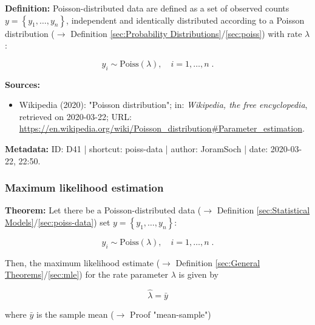 \documentclass[a4paper,12pt,twoside]{book}
\begin{document}
\textbf{Definition:} Poisson-distributed data are defined as a set of observed counts $y = \left\lbrace y_1, \ldots, y_n \right\rbrace$, independent and identically distributed according to a Poisson distribution ($\rightarrow$ Definition \ref{sec:Probability Distributions}/\ref{sec:poiss}) with rate $\lambda$:

\begin{equation} \label{eq:poiss-data-Poiss}
y_i \sim \mathrm{Poiss}(\lambda), \quad i = 1, \ldots, n \; .
\end{equation}


\vspace{1em}
\textbf{Sources:}
\begin{itemize}
\item Wikipedia (2020): "Poisson distribution"; in: \textit{Wikipedia, the free encyclopedia}, retrieved on 2020-03-22; URL: \url{https://en.wikipedia.org/wiki/Poisson_distribution#Parameter_estimation}.
\end{itemize}


\vspace{1em}
\textbf{Metadata:} ID: D41 | shortcut: poiss-data | author: JoramSoch | date: 2020-03-22, 22:50.
\vspace{1em}



\subsubsection[\textbf{Maximum likelihood estimation}]{Maximum likelihood estimation} \label{sec:poiss-mle}
\setcounter{equation}{0}

\textbf{Theorem:} Let there be a Poisson-distributed data ($\rightarrow$ Definition \ref{sec:Statistical Models}/\ref{sec:poiss-data}) set $y = \left\lbrace y_1, \ldots, y_n \right\rbrace$:

\begin{equation} \label{eq:poiss-mle-Poiss}
y_i \sim \mathrm{Poiss}(\lambda), \quad i = 1, \ldots, n \; .
\end{equation}

Then, the maximum likelihood estimate ($\rightarrow$ Definition \ref{sec:General Theorems}/\ref{sec:mle}) for the rate parameter $\lambda$ is given by

\begin{equation} \label{eq:poiss-mle-Poiss-MLE}
\hat{\lambda} = \bar{y}
\end{equation}

where $\bar{y}$ is the sample mean ($\rightarrow$ Proof "mean-sample")
\end{document}
